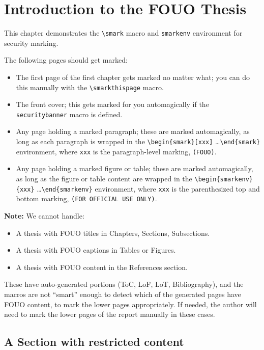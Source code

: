 \chapter{Introduction to the FOUO Thesis}

This chapter demonstrates the \verb|\smark| macro and
\verb|smarkenv| environment for security marking.

\smarkthispage

The following pages should get marked:
\begin{itemize}
\item The first page of the first chapter gets marked no matter what;
you can do this manually with the \verb|\smarkthispage| macro.
\item The front cover; this gets marked for you automagically if the
\verb|securitybanner| macro is defined.
\item Any page holding a marked paragraph; these are marked
automagically, as long as each paragraph is wrapped in the
\verb|\begin{smark}[xxx]| \ldots \verb|\end{smark}| environment,
where \verb|xxx| is the paragraph-level marking, \ie \verb|(FOUO)|.
\item Any page holding a marked figure or table; these are
marked automagically, as long as the figure or table content are
wrapped in the \verb|\begin{smarkenv}{xxx}| \ldots \verb|\end{smarkenv}|
environment, where \verb|xxx| is the parenthesized top and bottom
marking, \ie \verb|(FOR OFFICIAL USE ONLY)|.
\end{itemize}

\textbf{Note:} We cannot handle:
\begin{itemize}
\item A thesis with FOUO titles in Chapters, Sections, Subsections.
\item A thesis with FOUO captions in Tables or Figures.
\item A thesis with FOUO content in the References section.
\end{itemize}
These have auto-generated portions (ToC, LoF, LoT, Bibliography),
and the macros are not ``smart'' enough to detect which of the
generated pages have FOUO content, to mark the lower pages
appropriately. If needed, the author will need to mark the lower
pages of the report manually in these cases.

\newpage
\section{A Section with restricted content}


